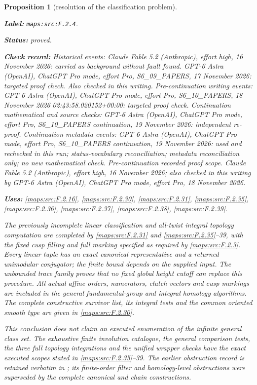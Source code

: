 \documentclass[11pt,a4paper]{article}
\newtheorem{proposition}[proposition]{Proposition}
\theoremstyle{definition}
\newcommand{\StatementRecord}[4]{\par\smallskip\begingroup\upshape\raggedright\noindent\textbf{Label:} \nolinkurl{#1}.\par\noindent\textbf{Status:} #2.\par\noindent\textbf{Check record:} #3.\par\noindent\textbf{Uses:} #4.\par\endgroup\smallskip}
\begin{document}
\begin{proposition}[resolution of the classification problem]\label{maps:src:F.2.4}
\StatementRecord{maps:src:F.2.4}{proved}{Historical events: Claude Fable 5.2 (Anthropic), effort high, 16 November 2026: carried as background without fault found. GPT-6 Astra (OpenAI), ChatGPT Pro mode, effort Pro, S6\_09\_PAPERS, 17 November 2026: targeted proof check. Also checked in this writing. Pre-continuation writing events: GPT-6 Astra (OpenAI), ChatGPT Pro mode, effort Pro, S6\_10\_PAPERS, 18 November 2026 02:43:58.020152+00:00: targeted proof check. Continuation mathematical and source checks: GPT-6 Astra (OpenAI), ChatGPT Pro mode, effort Pro, S6\_10\_PAPERS continuation, 19 November 2026: independent re-proof. Continuation metadata events: GPT-6 Astra (OpenAI), ChatGPT Pro mode, effort Pro, S6\_10\_PAPERS continuation, 19 November 2026: used and rechecked in this run; status-vocabulary reconciliation; metadata reconciliation only; no new mathematical check. \emph{Pre-continuation recorded proof scope.} Claude Fable 5.2 (Anthropic), effort high, 16 November 2026; also checked in this writing by GPT-6 Astra (OpenAI), ChatGPT Pro mode, effort Pro, 18 November 2026}{\cref{maps:src:F.2.16}, \cref{maps:src:F.2.30}, \cref{maps:src:F.2.31}, \cref{maps:src:F.2.35}, \cref{maps:src:F.2.36}, \cref{maps:src:F.2.37}, \cref{maps:src:F.2.38}, \cref{maps:src:F.2.39}}


The previously incomplete linear classification and all-twist
integral topology computation are completed by \ref{maps:src:F.2.31} and
\ref{maps:src:F.2.35}--39, with the fixed cusp filling and full marking
specified as required by \ref{maps:src:F.2.3}.  Every linear tuple has an
exact canonical representative and a returned unimodular
conjugator; the finite bound depends on the supplied input.
The unbounded trace family proves that no fixed global
height cutoff can replace this procedure.  All actual affine
orders, numerators, clutch vectors and cusp markings are
included in the general fundamental-group and integral
homology algorithms.  The complete constructive survivor
list, its integral tests and the common oriented smooth
type are given in \ref{maps:src:F.2.30}.

This conclusion does not claim an executed enumeration of
the infinite general class set.  The exhaustive finite
involution catalogue, the general comparison tests, the
three full topology integrations and the unified wrapper
checks have the exact executed scopes stated in \ref{maps:src:F.2.35}--39.
The earlier obstruction record is retained verbatim in
; its finite-order
filter and homology-level obstructions were superseded by
the complete canonical and chain constructions.


\end{proposition}
\end{document}
